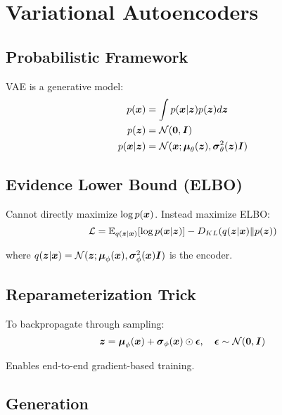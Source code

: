 \section{Variational Autoencoders}
\label{sec:vae}

\subsection{Probabilistic Framework}

VAE is a generative model:
\begin{align}
p(\boldsymbol{x}) &= \int p(\boldsymbol{x}|\boldsymbol{z}) p(\boldsymbol{z}) d\boldsymbol{z} \\
p(\boldsymbol{z}) &= \mathcal{N}(\boldsymbol{0}, \boldsymbol{I}) \\
p(\boldsymbol{x}|\boldsymbol{z}) &= \mathcal{N}(\boldsymbol{x}; \boldsymbol{\mu}_{\theta}(\boldsymbol{z}), \boldsymbol{\sigma}^2_{\theta}(\boldsymbol{z})\boldsymbol{I})
\end{align}

\subsection{Evidence Lower Bound (ELBO)}

Cannot directly maximize $\log p(\boldsymbol{x})$. Instead maximize ELBO:
\begin{equation}
\mathcal{L} = \mathbb{E}_{q(\boldsymbol{z}|\boldsymbol{x})}[\log p(\boldsymbol{x}|\boldsymbol{z})] - D_{KL}(q(\boldsymbol{z}|\boldsymbol{x}) \| p(\boldsymbol{z}))
\end{equation}

where $q(\boldsymbol{z}|\boldsymbol{x}) = \mathcal{N}(\boldsymbol{z}; \boldsymbol{\mu}_{\phi}(\boldsymbol{x}), \boldsymbol{\sigma}^2_{\phi}(\boldsymbol{x})\boldsymbol{I})$ is the encoder.

\subsection{Reparameterization Trick}

To backpropagate through sampling:
\begin{equation}
\boldsymbol{z} = \boldsymbol{\mu}_{\phi}(\boldsymbol{x}) + \boldsymbol{\sigma}_{\phi}(\boldsymbol{x}) \odot \boldsymbol{\epsilon}, \quad \boldsymbol{\epsilon} \sim \mathcal{N}(\boldsymbol{0}, \boldsymbol{I})
\end{equation}

Enables end-to-end gradient-based training.

\subsection{Generation}

